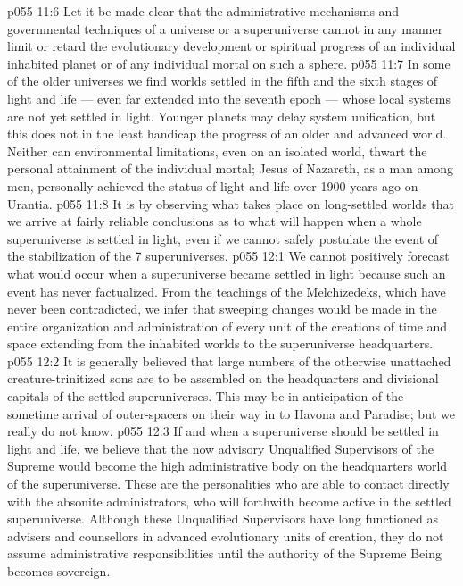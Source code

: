 \vs p055 11:6 Let it be made clear that the administrative mechanisms and governmental techniques of a universe or a superuniverse cannot in any manner limit or retard the evolutionary development or spiritual progress of an individual inhabited planet or of any individual mortal on such a sphere.
\vs p055 11:7 In some of the older universes we find worlds settled in the fifth and the sixth stages of light and life --- even far extended into the seventh epoch --- whose local systems are not yet settled in light. Younger planets may delay system unification, but this does not in the least handicap the progress of an older and advanced world. Neither can environmental limitations, even on an isolated world, thwart the personal attainment of the individual mortal; Jesus of Nazareth, as a man among men, personally achieved the status of light and life over 1900 years ago on Urantia.
\vs p055 11:8 It is by observing what takes place on long\hyp{}settled worlds that we arrive at fairly reliable conclusions as to what will happen when a whole superuniverse is settled in light, even if we cannot safely postulate the event of the stabilization of the 7 superuniverses.
\vs p055 12:1 We cannot positively forecast what would occur when a superuniverse became settled in light because such an event has never factualized. From the teachings of the Melchizedeks, which have never been contradicted, we infer that sweeping changes would be made in the entire organization and administration of every unit of the creations of time and space extending from the inhabited worlds to the superuniverse headquarters.
\vs p055 12:2 It is generally believed that large numbers of the otherwise unattached creature\hyp{}trinitized sons are to be assembled on the headquarters and divisional capitals of the settled superuniverses. This may be in anticipation of the sometime arrival of outer\hyp{}spacers on their way in to Havona and Paradise; but we really do not know.
\vs p055 12:3 \pc If and when a superuniverse should be settled in light and life, we believe that the now advisory Unqualified Supervisors of the Supreme would become the high administrative body on the headquarters world of the superuniverse. These are the personalities who are able to contact directly with the absonite administrators, who will forthwith become active in the settled superuniverse. Although these Unqualified Supervisors have long functioned as advisers and counsellors in advanced evolutionary units of creation, they do not assume administrative responsibilities until the authority of the Supreme Being becomes sovereign.
